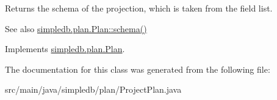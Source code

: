 Returns the schema of the projection, which is taken from the field list. \begin{DoxySeeAlso}{See also}
\hyperlink{interfacesimpledb_1_1plan_1_1Plan_ad0ee1aa2c4e7147e9f8fc6f3301fa986}{simpledb.\+plan.\+Plan\+::schema()} 
\end{DoxySeeAlso}


Implements \hyperlink{interfacesimpledb_1_1plan_1_1Plan_ad0ee1aa2c4e7147e9f8fc6f3301fa986}{simpledb.\+plan.\+Plan}.



The documentation for this class was generated from the following file\+:\begin{DoxyCompactItemize}
\item 
src/main/java/simpledb/plan/Project\+Plan.\+java\end{DoxyCompactItemize}
